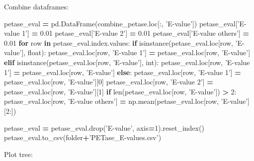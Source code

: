 \documentclass[
]{article}
\newenvironment{Shaded}{\begin{snugshade}}{\end{snugshade}}
\newcommand{\BuiltInTok}[1]{#1}
\newcommand{\ControlFlowTok}[1]{\textcolor[rgb]{0.13,0.29,0.53}{\textbf{#1}}}
\newcommand{\DecValTok}[1]{\textcolor[rgb]{0.00,0.00,0.81}{#1}}
\newcommand{\FloatTok}[1]{\textcolor[rgb]{0.00,0.00,0.81}{#1}}
\newcommand{\KeywordTok}[1]{\textcolor[rgb]{0.13,0.29,0.53}{\textbf{#1}}}
\newcommand{\NormalTok}[1]{#1}
\newcommand{\OperatorTok}[1]{\textcolor[rgb]{0.81,0.36,0.00}{\textbf{#1}}}
\newcommand{\StringTok}[1]{\textcolor[rgb]{0.31,0.60,0.02}{#1}}
\begin{document}
Combine dataframes:

\begin{Shaded}
\begin{Highlighting}[]
\NormalTok{petase_eval }\OperatorTok{=}\NormalTok{ pd.DataFrame(combine_petase.loc[:, }\StringTok{'E-value'}\NormalTok{])}
\NormalTok{petase_eval[}\StringTok{'E-value 1'}\NormalTok{] }\OperatorTok{=} \FloatTok{0.01}
\NormalTok{petase_eval[}\StringTok{'E-value 2'}\NormalTok{] }\OperatorTok{=} \FloatTok{0.01}
\NormalTok{petase_eval[}\StringTok{'E-value others'}\NormalTok{] }\OperatorTok{=} \FloatTok{0.01}
\ControlFlowTok{for}\NormalTok{ row }\KeywordTok{in}\NormalTok{ petase_eval.index.values:}
  \ControlFlowTok{if} \BuiltInTok{isinstance}\NormalTok{(petase_eval.loc[row, }\StringTok{'E-value'}\NormalTok{], }\BuiltInTok{float}\NormalTok{):}
\NormalTok{    petase_eval.loc[row, }\StringTok{'E-value 1'}\NormalTok{] }\OperatorTok{=}\NormalTok{ petase_eval.loc[row, }\StringTok{'E-value'}\NormalTok{]}
  \ControlFlowTok{elif} \BuiltInTok{isinstance}\NormalTok{(petase_eval.loc[row, }\StringTok{'E-value'}\NormalTok{], }\BuiltInTok{int}\NormalTok{):}
\NormalTok{    petase_eval.loc[row, }\StringTok{'E-value 1'}\NormalTok{] }\OperatorTok{=}\NormalTok{ petase_eval.loc[row, }\StringTok{'E-value'}\NormalTok{]}
  \ControlFlowTok{else}\NormalTok{:}
\NormalTok{    petase_eval.loc[row, }\StringTok{'E-value 1'}\NormalTok{] }\OperatorTok{=}\NormalTok{ petase_eval.loc[row, }\StringTok{'E-value'}\NormalTok{][}\DecValTok{0}\NormalTok{]}
\NormalTok{    petase_eval.loc[row, }\StringTok{'E-value 2'}\NormalTok{] }\OperatorTok{=}\NormalTok{ petase_eval.loc[row, }\StringTok{'E-value'}\NormalTok{][}\DecValTok{1}\NormalTok{]}
    \ControlFlowTok{if} \BuiltInTok{len}\NormalTok{(petase_eval.loc[row, }\StringTok{'E-value'}\NormalTok{]) }\OperatorTok{>} \DecValTok{2}\NormalTok{:}
\NormalTok{      petase_eval.loc[row, }\StringTok{'E-value others'}\NormalTok{] }\OperatorTok{=}\NormalTok{ np.mean(petase_eval.loc[row, }\StringTok{'E-value'}\NormalTok{][}\DecValTok{2}\NormalTok{:])}

\NormalTok{petase_eval }\OperatorTok{=}\NormalTok{ petase_eval.drop(}\StringTok{'E-value'}\NormalTok{, axis}\OperatorTok{=}\DecValTok{1}\NormalTok{).reset_index()}
\NormalTok{petase_eval.to_csv(folder}\OperatorTok{+}\StringTok{'PETase_E-values.csv'}\NormalTok{)}
\end{Highlighting}
\end{Shaded}

Plot tree:
\end{document}
